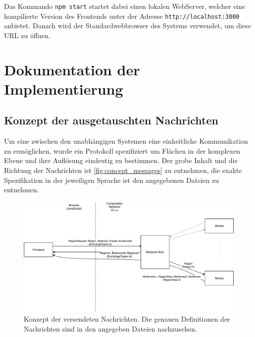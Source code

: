Das Kommando \verb|npm start| startet dabei einen lokalen WebServer, welcher eine kompilierte Version des Frontends
unter der Adresse \verb|http://localhost:3000| anbietet. Danach wird der Standardwebbrowser des Systems verwendet, um diese
URL zu öffnen.



\section{Dokumentation der Implementierung}

\subsection{Konzept der ausgetauschten Nachrichten}

Um eine zwischen den unabhängigen Systemen eine einheitliche Kommunikation zu ermöglichen,
wurde ein Protokoll spezifiziert um Flächen in der komplexen Ebene und ihre Auflösung eindeutig zu bestimmen.
Der grobe Inhalt und die Richtung der Nachrichten ist \autoref{fig:concept_messages} zu entnehmen,
die exakte Spezifikation in der jeweiligen Sprache ist den angegebenen Dateien zu entnehmen.

\begin{figure}
	\includegraphics[width=0.9\linewidth]{img/Implementierung/Nachrichtenuebersicht.pdf}
	\caption{Konzept der versendeten Nachrichten. Die genauen Definitionen der Nachrichten sind in den angegeben Dateien nachzusehen.}
	\label{fig:concept_messages}
\end{figure}


